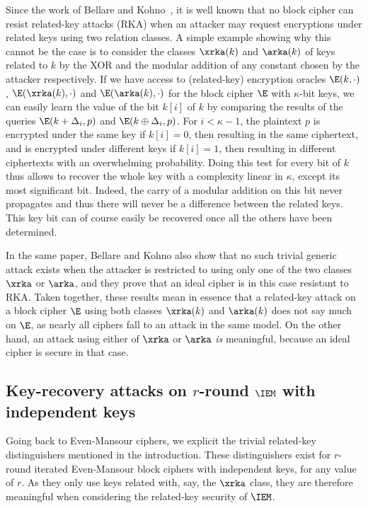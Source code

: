 Since the work of Bellare and Kohno~\cite{BK03}, it is well known that no block cipher can resist
related-key attacks (RKA) when an attacker may request encryptions under related keys
using two relation classes. A simple example showing why this cannot be the case
is to consider the classes $\xrka(k)$ and $\arka(k)$ of keys
related to $k$ by the XOR and the modular addition of any constant chosen by the attacker respectively.
If we have access to (related-key) encryption oracles
$\E(k,\cdot)$, $\E(\xrka(k),\cdot)$ and $\E(\arka(k),\cdot)$ for the block cipher $\E$ with $\kappa$-bit keys,
we can easily learn the value of the bit $k[i]$ of $k$ by comparing the results of the queries
$\E(k + \Delta_i, p)$
and $\E(k \oplus \Delta_i, p)$. For $i < \kappa - 1$, the plaintext
$p$ is encrypted under the same key if
$k[i] = 0$, then resulting in the same ciphertext, and is
encrypted under different keys if $k[i] = 1$, then resulting in different ciphertexts
with an overwhelming probability.
Doing this test for every bit of $k$ thus allows to recover the whole key
with a complexity linear in $\kappa$, except its most significant bit. Indeed,
the carry of a modular addition on this bit never propagates and thus there will never be a difference between the related keys.
This key bit can of course easily be recovered once all the others have been determined.

In the same paper, Bellare and Kohno also show that no such trivial generic attack exists when
the attacker is restricted to using
only one of the two classes $\xrka$ or $\arka$, and they prove that an ideal
cipher is in this case resistant to RKA. Taken together, these results mean in essence
that a related-key attack on a block cipher $\E$ using both classes $\xrka(k)$ and $\arka(k)$ does not say
much on $\E$, as nearly all ciphers fall to an attack
in the same model. On the other hand, an attack using either of $\xrka$ or $\arka$ \emph{is} meaningful,
because an ideal cipher is secure in that case.

\subsection{Key-recovery attacks on $r$-round $\IEM$ with independent keys}

Going back to Even-Mansour ciphers, we explicit the
trivial related-key distinguishers mentioned in the introduction. These distinguishers exist
for $r$-round iterated Even-Mansour block ciphers with independent keys, for any value of $r$.
As they only use keys related with, say, the $\xrka$ class,
they are therefore meaningful when considering the related-key security of $\IEM$.

